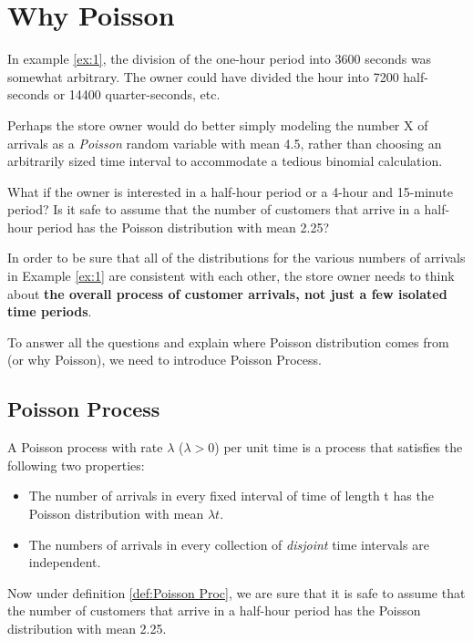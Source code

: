 \documentclass[letterpaper,12pt]{article}
\theoremstyle{plain}
\begin{document}
\section{Why Poisson}
In example \ref{ex:1}, the division of the one-hour period into 3600 seconds was somewhat arbitrary. The owner could have divided the hour into 7200 half-seconds or 14400 quarter-seconds, etc.

Perhaps the store owner would do better simply modeling the number X of arrivals as a \textit{Poisson} random variable with mean 4.5, rather than choosing an arbitrarily sized time interval to accommodate a tedious binomial calculation.

What if the owner is interested in a half-hour period or a 4-hour and 15-minute period? Is it safe to assume that the number of customers that arrive in a half-hour period has the Poisson distribution with mean 2.25? 

In order to be sure that all of the distributions for the various numbers of arrivals in Example \ref{ex:1} are consistent with each other, the store owner needs to think about \textbf{the overall process of customer arrivals, not just a few isolated time periods}.

To answer all the questions and explain where Poisson distribution comes from (or why Poisson), we need to introduce Poisson Process. 

\subsection{Poisson Process}
\begin{definition}\label{def:Poisson Proc}
A Poisson process with rate $\lambda$ ($\lambda >0$) per unit time is a process that satisfies the following two properties:
\begin{itemize}
\item The number of arrivals in every fixed interval of time of length t has the Poisson distribution with mean $\lambda t$.
\item The numbers of arrivals in every collection of \emph{disjoint} time intervals are independent.
\end{itemize}
\end{definition}

Now under definition \ref{def:Poisson Proc}, we are sure that it is safe to assume that the number of customers that arrive in a half-hour period has the Poisson distribution with mean 2.25. 
\end{document}
